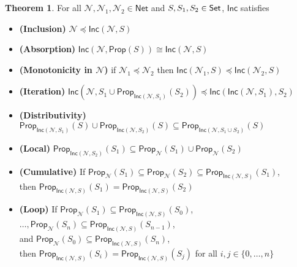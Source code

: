 \documentclass[12pt]{article}
\newcommand{\Set}{\mbox{\sf Set}}
\theoremstyle{definition}
\newtheorem{theorem}{Theorem}
\newcommand{\set}[1]{\{ #1 \}}
\newcommand{\Prop}{\textsf{Prop}}
\newcommand{\Inc}{\textsf{Inc}}
\newcommand{\AllNets}{\mathsf{Net}}
\newcommand{\Net}{\mathcal{N}}
\begin{document}
\begin{theorem}
For all $\Net, \Net_1, \Net_2 \in \AllNets$ and $S, S_1, S_2 \in \Set$, $\Inc$ satisfies
\begin{itemize}
    \item \textbf{(Inclusion)}
    $\Net \preceq \Inc(\Net, S)$
    
    \item \textbf{(Absorption)}
    $\Inc(\Net, \Prop(S)) \cong \Inc(\Net, S)$
    
    \item \textbf{(Monotonicity in $\Net$)} if ${\Net_1 \preceq \Net_2}$
    then ${\Inc(\Net_1, S) \preceq \Inc(\Net_2, S)}$
    
    \item \textbf{(Iteration)}
    $\Inc(\Net, S_1 \cup \Prop_{\Inc(\Net, S_1)}(S_2))
    \preceq \Inc(\Inc(\Net, S_1), S_2)$
    
    \item \textbf{(Distributivity)}
    $\Prop_{\Inc(\Net, S_1)}(S) \cup \Prop_{\Inc(\Net, S_2)}(S)
    \subseteq \Prop_{\Inc(\Net, S_1 \cup S_2)}(S)$
    
    \item \textbf{(Local)}
    $\Prop_{\Inc(\Net, S_2)}(S_1) \subseteq \Prop_\Net(S_1) \cup \Prop_\Net(S_2)$
    
    \item \textbf{(Cumulative)} If ${\Prop_\Net(S_1) \subseteq \Prop_\Net(S_2)} \subseteq \Prop_{\Inc(\Net, S)}(S_1)$,\\
    then $\Prop_{\Inc(\Net, S)}(S_1) = \Prop_{\Inc(\Net, S)}(S_2)$
    
    \item \textbf{(Loop)} If ${\Prop_\Net(S_1) \subseteq \Prop_{\Inc(\Net, S)}(S_0)}$,
    $\ldots, {\Prop_\Net(S_n) \subseteq \Prop_{\Inc(\Net, S)}(S_{n-1})}$,\\
    and 
    ${\Prop_\Net(S_0) \subseteq \Prop_{\Inc(\Net, S)}(S_n)}$,\\
    then ${\Prop_{\Inc(\Net, S)}(S_i) = \Prop_{\Inc(\Net, S)}(S_j)}$
    for all $i, j \in \set{0, \ldots, n}$
\end{itemize}
\end{theorem}
\end{document}
